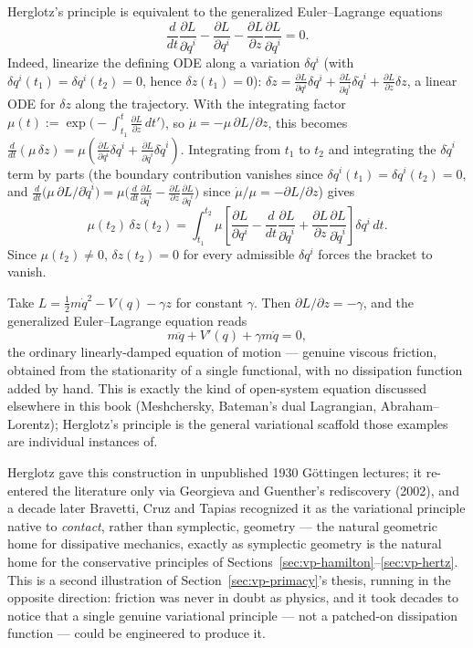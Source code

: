 Herglotz's principle is equivalent to the generalized Euler--Lagrange equations
\[
\frac{d}{dt}\frac{\partial L}{\partial\dot q^i} 
- \frac{\partial L}{\partial q^i} 
- \frac{\partial L}{\partial z}\frac{\partial L}{\partial\dot q^i} = 0 .
\]
Indeed, linearize the defining ODE along a variation $\delta q^i$ 
(with $\delta q^i(t_1)=\delta q^i(t_2)=0$, hence 
$\delta z(t_1)=0$): $\delta\dot z =
\frac{\partial L}{\partial q^i}\delta q^i+\frac{\partial L}{\partial \dot
q^i}\delta\dot q^i+\frac{\partial L}{\partial z}\delta z$, a linear ODE for
$\delta z$ along the trajectory. With the integrating factor
$\mu(t):=\exp\!\big(-\int_{t_1}^t \frac{\partial L}{\partial z}\,dt'\big)$, so
$\dot\mu=-\mu\,\partial L/\partial z$, this becomes $\frac{d}{dt}(\mu\,\delta
z) = \mu\left(\frac{\partial L}{\partial q^i}\delta q^i+\frac{\partial
L}{\partial\dot q^i}\delta\dot q^i\right)$. Integrating from $t_1$ to $t_2$ and
integrating the $\delta\dot q^i$ term by parts (the boundary contribution
vanishes since $\delta q^i(t_1)=\delta q^i(t_2)=0$, and
$\frac{d}{dt}\big(\mu\,\partial L/\partial\dot
q^i\big)=\mu\big(\frac{d}{dt}\frac{\partial L}{\partial\dot q^i}-\frac{\partial
L}{\partial z}\frac{\partial L}{\partial\dot q^i}\big)$ since
$\dot\mu/\mu=-\partial L/\partial z$) gives
\[
\mu(t_2)\,\delta z(t_2) = \int_{t_1}^{t_2}\mu\left[\frac{\partial L}{\partial q^i}-
\frac{d}{dt}\frac{\partial L}{\partial\dot q^i}+\frac{\partial L}{\partial z}
\frac{\partial L}{\partial \dot q^i}\right]\delta q^i\,dt .
\]
Since $\mu(t_2)\neq0$, $\delta z(t_2)=0$ for every admissible $\delta q^i$ 
forces the bracket to vanish.

\begin{example}
Take $L=\tfrac12 m\dot q^2 - V(q) - \gamma z$ for constant $\gamma$. Then
    $\partial L/\partial z=-\gamma$, and the generalized Euler--Lagrange
    equation reads
\[
m\ddot q + V'(q) + \gamma m\dot q = 0,
\]
the ordinary linearly-damped equation of motion --- genuine viscous friction,
    obtained from the stationarity of a single functional, with no dissipation
    function added by hand. This is exactly the kind of open-system equation
    discussed elsewhere in this book (Meshchersky, Bateman's dual Lagrangian,
    Abraham--Lorentz); Herglotz's principle is the general variational scaffold
    those examples are individual instances of.
\end{example}

Herglotz gave this construction in unpublished 1930 Göttingen lectures; it
re-entered the literature only via Georgieva and Guenther's rediscovery (2002),
and a decade later Bravetti, Cruz and Tapias recognized it as the variational
principle native to \emph{contact}, rather than symplectic, geometry --- the
natural geometric home for dissipative mechanics, exactly as symplectic
geometry is the natural home for the conservative principles of
Sections~\ref{sec:vp-hamilton}--\ref{sec:vp-hertz}. This is a second illustration of
Section~\ref{sec:vp-primacy}'s thesis, running in the opposite direction:
friction was never in doubt as physics, and it took
decades to notice that a single genuine variational principle --- not a
patched-on dissipation function --- could be engineered to produce it.


